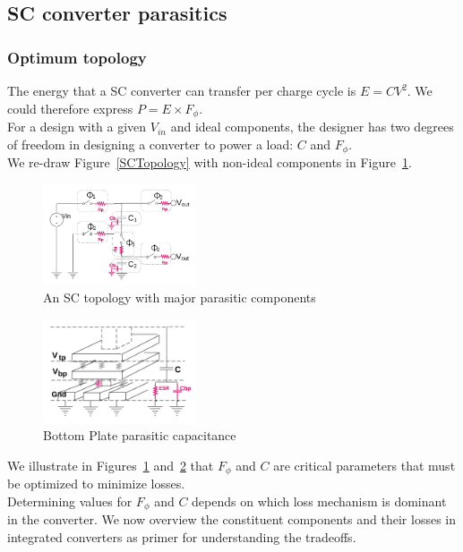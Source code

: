 \documentclass[letterpaper,twocolumn,10pt]{article}
\begin{document}
\subsection{SC converter parasitics}\label{SCConverterParasitics}

\subsubsection{Optimum topology }
The energy that a SC converter can transfer per charge cycle is $E = CV^2$. We could therefore express $P = E\times F_\phi$.\\
For a design with a given $V_{in}$ and ideal components, the designer has two degrees of freedom in designing a converter to power a load: $C$ and $F_\phi$.\\  
We re-draw Figure~\ref{SCTopology} with non-ideal components in Figure~\ref{NonIdealSCTopology}.\\
\begin{figure}[here]
\includegraphics[width=0.4\textwidth]{SCTopologyParasitics}
\caption{An SC topology with major parasitic components}
\label{NonIdealSCTopology}
\end{figure}
\begin{figure}[here]
\includegraphics[width=0.4\textwidth]{BottomPlateCap}
\caption{Bottom Plate parasitic capacitance}
\label{BottomPlatePar}
\end{figure}

 We illustrate in Figures~\ref{NonIdealSCTopology} and~\ref{BottomPlatePar} that $F_\phi$ and $C$ are critical parameters that must be optimized to minimize losses.\\
Determining values for $F_\phi$ and $C$ depends on which loss mechanism is dominant in the converter. We now overview the constituent components and their losses in integrated converters as primer for understanding the tradeoffs.\\ 
\end{document}
